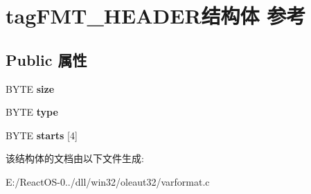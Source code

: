 \hypertarget{structtag_f_m_t___h_e_a_d_e_r}{}\section{tag\+F\+M\+T\+\_\+\+H\+E\+A\+D\+E\+R结构体 参考}
\label{structtag_f_m_t___h_e_a_d_e_r}
\subsection*{Public 属性}
\begin{DoxyCompactItemize}
\item 
\mbox{\label{structtag_f_m_t___h_e_a_d_e_r_a6ae102908e94e91dcb58d4b2c3cfd713}} 
B\+Y\+TE {\bfseries size}
\item 
\mbox{\label{structtag_f_m_t___h_e_a_d_e_r_a90225aee36a72b82d5f086f66f3c143d}} 
B\+Y\+TE {\bfseries type}
\item 
\mbox{\label{structtag_f_m_t___h_e_a_d_e_r_aee5243646be54fea15d23aaf33864ef9}} 
B\+Y\+TE {\bfseries starts} \mbox{[}4\mbox{]}
\end{DoxyCompactItemize}


该结构体的文档由以下文件生成\+:\begin{DoxyCompactItemize}
\item 
E\+:/\+React\+O\+S-\/0../dll/win32/oleaut32/varformat.\+c\end{DoxyCompactItemize}
